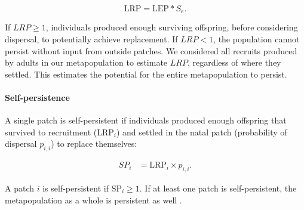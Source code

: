 \documentclass[12pt, oneside]{article}   	%
\begin{document}
\begin{equation}
\text{LRP} = \text{LEP} * S_e. \label{EQN_LRP}
\end{equation}

If $LRP \geq 1$, individuals produced enough surviving offspring, before considering dispersal, to potentially achieve replacement. If $LRP < 1$, the population cannot persist without input from outside patches. We considered all recruits produced by adults in our metapopulation to estimate $LRP$, regardless of where they settled. This estimates the potential for the entire metapopulation to persist.

\paragraph*{Self-persistence} 

A single patch is self-persistent if individuals produced enough offspring that survived to recruitment ($\text{LRP}_i$) and settled in the natal patch (probability of dispersal $p_{i,i}$) to replace themselves:

\begin{equation}
\begin{split}
SP_i &= \text{LRP}_i \times p_{i,i}. \label{EQN_SP}  %
\end{split}
\end{equation}


A patch $i$ is self-persistent if $\text{SP}_i \geq 1$. If at least one patch is self-persistent, the metapopulation as a whole is persistent as well \citep{hastings_persistence_2006, burgess2014beyond}. 

\end{document}
